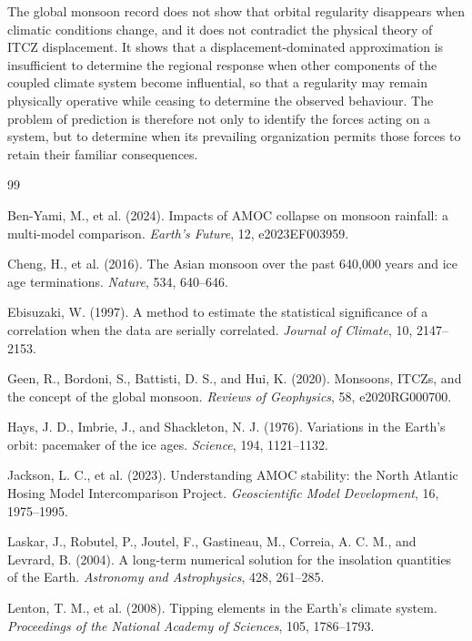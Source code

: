 \documentclass[11pt]{article}
\theoremstyle{definition}
\begin{document}
The global monsoon record does not show that orbital regularity disappears when climatic conditions change, and it does not contradict the physical theory of ITCZ displacement. It shows that a displacement-dominated approximation is insufficient to determine the regional response when other components of the coupled climate system become influential, so that a regularity may remain physically operative while ceasing to determine the observed behaviour. The problem of prediction is therefore not only to identify the forces acting on a system, but to determine when its prevailing organization permits those forces to retain their familiar consequences.

\begin{thebibliography}{99}

 Ben-Yami, M., et al. (2024). Impacts of AMOC collapse on monsoon rainfall: a multi-model comparison. \emph{Earth's Future}, 12, e2023EF003959.

 Cheng, H., et al. (2016). The Asian monsoon over the past 640,000 years and ice age terminations. \emph{Nature}, 534, 640--646.

 Ebisuzaki, W. (1997). A method to estimate the statistical significance of a correlation when the data are serially correlated. \emph{Journal of Climate}, 10, 2147--2153.

 Geen, R., Bordoni, S., Battisti, D. S., and Hui, K. (2020). Monsoons, ITCZs, and the concept of the global monsoon. \emph{Reviews of Geophysics}, 58, e2020RG000700.

 Hays, J. D., Imbrie, J., and Shackleton, N. J. (1976). Variations in the Earth's orbit: pacemaker of the ice ages. \emph{Science}, 194, 1121--1132.

 Jackson, L. C., et al. (2023). Understanding AMOC stability: the North Atlantic Hosing Model Intercomparison Project. \emph{Geoscientific Model Development}, 16, 1975--1995.

 Laskar, J., Robutel, P., Joutel, F., Gastineau, M., Correia, A. C. M., and Levrard, B. (2004). A long-term numerical solution for the insolation quantities of the Earth. \emph{Astronomy and Astrophysics}, 428, 261--285.

 Lenton, T. M., et al. (2008). Tipping elements in the Earth's climate system. \emph{Proceedings of the National Academy of Sciences}, 105, 1786--1793.


\end{thebibliography}
\end{document}
